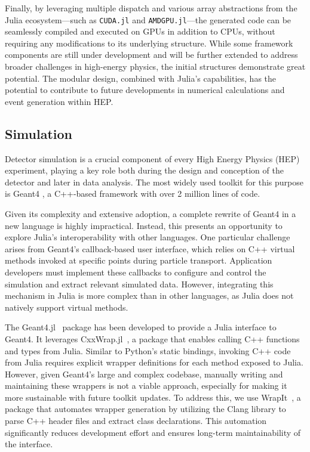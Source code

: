 \documentclass{webofc}
\begin{document}
Finally, by leveraging multiple dispatch and various array abstractions from the
Julia ecosystem—such as \texttt{CUDA.jl} and \texttt{AMDGPU.jl}—the generated
code can be seamlessly compiled and executed on GPUs in addition to CPUs,
without requiring any modifications to its underlying structure. While some
framework components are still under development and will be further extended to
address broader challenges in high-energy physics, the initial structures
demonstrate great potential. The modular design, combined with Julia's
capabilities, has the potential to contribute to future developments in
numerical calculations and event generation within HEP.


\subsection{Simulation}
\label{sec:simulation}

Detector simulation is a crucial component of every High Energy Physics (HEP)
experiment, playing a key role both during the design and conception of the
detector and later in data analysis. The most widely used toolkit for this
purpose is Geant4 \cite{GEANT4:2002zbu}, a C++-based framework with over 2
million lines of code.

Given its complexity and extensive adoption, a complete rewrite of Geant4 in a
new language is highly impractical. Instead, this presents an opportunity to
explore Julia's interoperability with other languages. One particular challenge
arises from Geant4's callback-based user interface, which relies on C++ virtual
methods invoked at specific points during particle transport. Application
developers must implement these callbacks to configure and control the
simulation and extract relevant simulated data. However, integrating this
mechanism in Julia is more complex than in other languages, as Julia does not
natively support virtual methods.

The Geant4.jl~\cite{geant4-jl-github} package has been developed to provide a
Julia interface to Geant4. It leverages CxxWrap.jl~\cite{CxxWrap.jl}, a
package that enables calling C++ functions and types from Julia. Similar to
Python's static bindings, invoking C++ code from Julia requires explicit wrapper
definitions for each method exposed to Julia. However, given Geant4's large and
complex codebase, manually writing and maintaining these wrappers is not a
viable approach, especially for making it more sustainable with future toolkit
updates. To address this, we use WrapIt~\cite{wrapit-github}, a package that
automates wrapper generation by utilizing the Clang library to parse C++ header
files and extract class declarations. This automation significantly reduces
development effort and ensures long-term maintainability of the interface.
\end{document}
